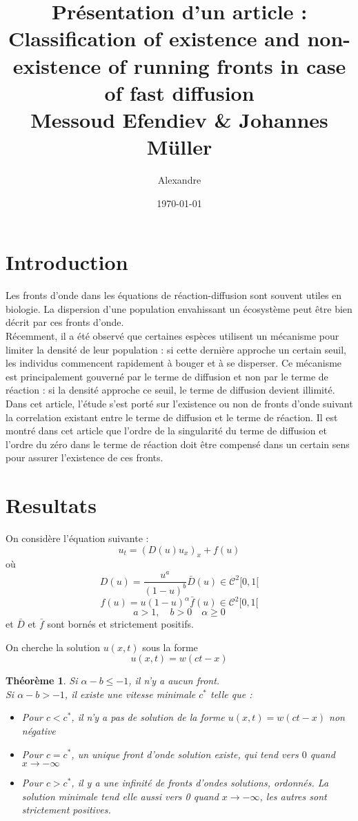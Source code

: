 \documentclass{article}
\title{Pr\'esentation d'un article : \\ Classification of existence and non-existence of running fronts in case of fast diffusion\\\small{Messoud Efendiev \& Johannes M\"uller}}
\author{Alexandre \bsc{Vieira}}
\date{\today}
\newtheorem{theorem}{Théorème}[subsection]
\begin{document}
\maketitle
\tableofcontents

\newpage

\section*{Introduction}
Les fronts d'onde dans les équations de réaction-diffusion sont souvent utiles en biologie. La dispersion d'une population envahissant un écosystème peut être bien décrit par ces fronts d'onde.\\
Récemment, il a été observé que certaines espèces utilisent un mécanisme pour limiter la densité de leur population : si cette dernière approche un certain seuil, les individus commencent rapidement à bouger et à se disperser. Ce mécanisme est principalement gouverné par le terme de diffusion et non par le terme de réaction : si la densité approche ce seuil, le terme de diffusion devient illimité. \\
Dans cet article, l'étude s'est porté sur l'existence ou non de fronts d'onde suivant la correlation existant entre le terme de diffusion et le terme de réaction. Il est montré dans cet article que l'ordre de la singularité du terme de diffusion et l'ordre du zéro dans le terme de réaction doit être compensé dans un certain sens pour assurer l'existence de ces fronts.

\section{Resultats}
On considère l'équation suivante :
	\begin{equation} \label{eqnG} u_t=(D(u)u_x)_x + f(u)\end{equation}
où
	\[D(u)=\frac{u^a}{(1-u)^b}\bar{D}(u)\in\mathcal{C}^2[0,1[\]
	\[f(u)=u(1-u)^\alpha \bar{f}(u)\in\mathcal{C}^2[0,1[\]
	\[a>1,\hspace{1em} b>0 \hspace{1em} \alpha\geq 0\]
et $\bar{D}$ et $\bar{f}$ sont bornés et strictement positifs.

\bigskip
	On cherche la solution $u(x,t)$ sous la forme \[u(x,t)=w(ct-x)\]

\begin{theorem}
Si $\alpha-b\leq -1$, il n'y a aucun front.\\
	Si $\alpha-b>-1$, il existe une vitesse minimale $c^*$ telle que :
	\begin{itemize}
		\item Pour $c<c^*$, il n'y a pas de solution de la forme $u(x,t)=w(ct-x)$ non négative
		\item Pour $c=c^*$, un unique front d'onde solution existe, qui tend vers $0$ quand $x\to-\infty$
		\item Pour $c>c^*$, il y a une infinité de fronts d'ondes solutions, ordonnés. La solution minimale tend elle aussi vers 0 quand $x\to -\infty$, les autres sont strictement positives.
	\end{itemize}
\end{theorem}
\end{document}
